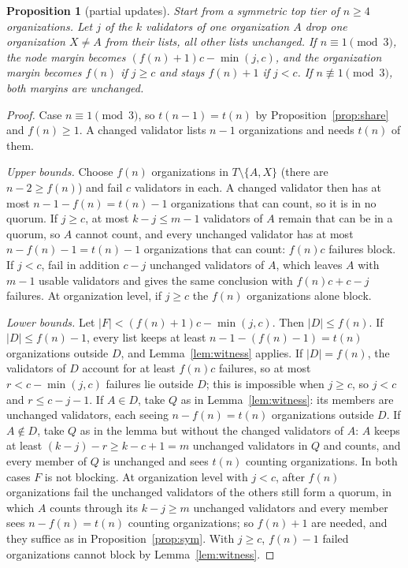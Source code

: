 \documentclass[11pt,a4paper]{article}
\newtheorem{proposition}{Proposition}
\begin{document}
\begin{proposition}[partial updates]\label{prop:partial}
Start from a symmetric top tier of $n\ge 4$ organizations. Let $j$ of the $k$ validators of one organization $A$ drop one organization $X\neq A$ from their lists, all other lists unchanged. If $n\equiv1\pmod 3$, the node margin becomes $(f(n)+1)c-\min(j,c)$, and the organization margin becomes $f(n)$ if $j\ge c$ and stays $f(n)+1$ if $j<c$. If $n\not\equiv 1\pmod 3$, both margins are unchanged.
\end{proposition}
\begin{proof}
Case $n\equiv 1\pmod 3$, so $t(n-1)=t(n)$ by Proposition~\ref{prop:share} and $f(n)\ge 1$. A changed validator lists $n-1$ organizations and needs $t(n)$ of them.

\emph{Upper bounds.} Choose $f(n)$ organizations in $T\setminus\{A,X\}$ (there are $n-2\ge f(n)$) and fail $c$ validators in each. A changed validator then has at most $n-1-f(n)=t(n)-1$ organizations that can count, so it is in no quorum. If $j\ge c$, at most $k-j\le m-1$ validators of $A$ remain that can be in a quorum, so $A$ cannot count, and every unchanged validator has at most $n-f(n)-1=t(n)-1$ organizations that can count: $f(n)c$ failures block. If $j<c$, fail in addition $c-j$ unchanged validators of $A$, which leaves $A$ with $m-1$ usable validators and gives the same conclusion with $f(n)c+c-j$ failures. At organization level, if $j\ge c$ the $f(n)$ organizations alone block.

\emph{Lower bounds.} Let $|F|<(f(n)+1)c-\min(j,c)$. Then $|D|\le f(n)$. If $|D|\le f(n)-1$, every list keeps at least $n-1-(f(n)-1)=t(n)$ organizations outside $D$, and Lemma~\ref{lem:witness} applies. If $|D|=f(n)$, the validators of $D$ account for at least $f(n)c$ failures, so at most $r<c-\min(j,c)$ failures lie outside $D$; this is impossible when $j\ge c$, so $j<c$ and $r\le c-j-1$. If $A\in D$, take $Q$ as in Lemma~\ref{lem:witness}: its members are unchanged validators, each seeing $n-f(n)=t(n)$ organizations outside $D$. If $A\notin D$, take $Q$ as in the lemma but without the changed validators of $A$: $A$ keeps at least $(k-j)-r\ge k-c+1=m$ unchanged validators in $Q$ and counts, and every member of $Q$ is unchanged and sees $t(n)$ counting organizations. In both cases $F$ is not blocking. At organization level with $j<c$, after $f(n)$ organizations fail the unchanged validators of the others still form a quorum, in which $A$ counts through its $k-j\ge m$ unchanged validators and every member sees $n-f(n)=t(n)$ counting organizations; so $f(n)+1$ are needed, and they suffice as in Proposition~\ref{prop:sym}. With $j\ge c$, $f(n)-1$ failed organizations cannot block by Lemma~\ref{lem:witness}.


\end{proof}
\end{document}
